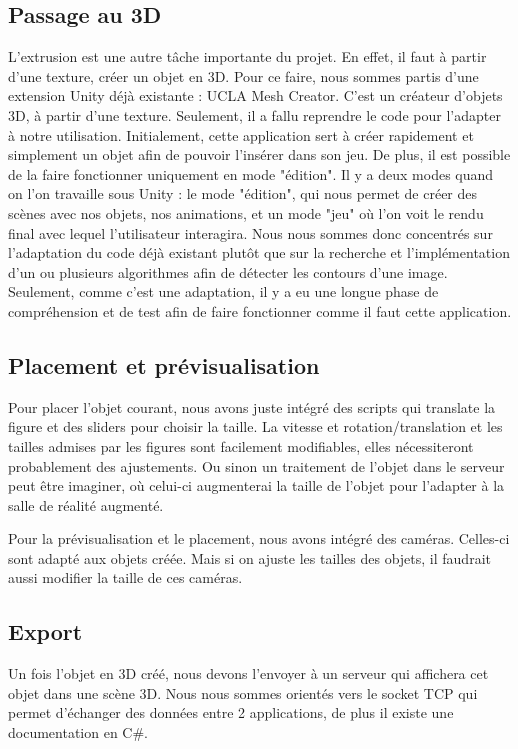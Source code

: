 \documentclass[a4paper,11pt]{article}
\begin{document}
		\hypertarget{ancre}{
		\subsection{Passage au 3D}}
		\label{extrusion}
		L'extrusion est une autre tâche importante du projet. En effet, il faut à partir d'une texture, créer un objet en 3D. Pour ce faire, nous sommes partis d'une extension Unity déjà existante : UCLA Mesh Creator. C'est un créateur d'objets 3D, à partir d'une texture. Seulement, il a fallu reprendre le code pour l'adapter à notre utilisation. Initialement, cette application sert à créer rapidement et simplement un objet afin de pouvoir l'insérer dans son jeu. De plus, il est possible de la faire fonctionner uniquement en mode "édition". Il y a deux modes quand on l'on travaille sous Unity : le mode "édition", qui nous permet de créer des scènes avec nos objets, nos animations, et un mode "jeu" où l'on voit le rendu final avec lequel l'utilisateur interagira. Nous nous sommes donc concentrés sur l'adaptation du code déjà existant plutôt que sur la recherche et l'implémentation d'un ou plusieurs algorithmes afin de détecter les contours d'une image. Seulement, comme c'est une adaptation, il y a eu une longue phase de compréhension et de test afin de faire fonctionner comme il faut cette application. 
		\subsection{Placement et prévisualisation}
		
			Pour placer l'objet courant, nous avons juste intégré des scripts qui translate la figure et des sliders pour choisir la taille. La vitesse et rotation/translation et les tailles admises par les figures sont facilement modifiables, elles nécessiteront probablement des ajustements. Ou sinon un traitement de l'objet dans le serveur peut être imaginer, où celui-ci augmenterai la taille de l'objet pour l'adapter à la salle de réalité augmenté.
			
			Pour la prévisualisation et le placement, nous avons intégré des caméras. Celles-ci sont adapté aux objets créée. Mais si on ajuste les tailles des objets, il faudrait aussi modifier la taille de ces caméras.

		\subsection{Export}
			Un fois l'objet en 3D créé, nous devons l'envoyer à un serveur qui affichera cet objet dans une scène 3D.
			Nous nous sommes orientés vers le socket TCP qui permet d'échanger des données entre 2 applications, de plus il existe une documentation en C\#.
						
\end{document}
